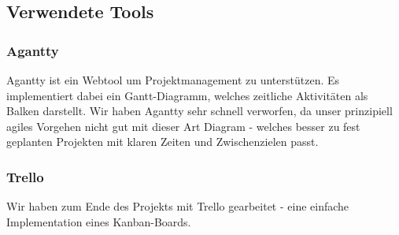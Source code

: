 \subsection{Verwendete Tools}
\subsubsection*{Agantty}
Agantty ist ein Webtool um Projektmanagement zu unterstützen. Es implementiert dabei ein Gantt-Diagramm, welches zeitliche Aktivitäten als Balken darstellt. Wir haben Agantty sehr schnell verworfen, da unser prinzipiell agiles Vorgehen nicht gut mit dieser Art Diagram - welches besser zu fest geplanten Projekten mit klaren Zeiten und Zwischenzielen passt.

\subsubsection*{Trello}
Wir haben zum Ende des Projekts mit Trello gearbeitet - eine einfache Implementation eines Kanban-Boards. 